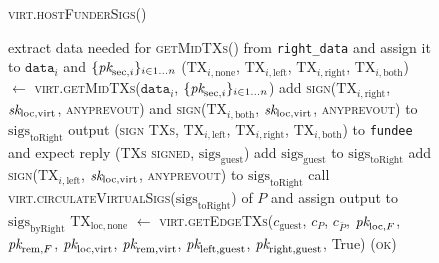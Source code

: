 \begin{figure}[H]
  \begin{processbox}{\textsc{virt.hostFunderSigs}()}
    \begin{algorithmic}[1]
        \State extract data needed for \textsc{getMidTXs}() from
        \texttt{right\_data} and assign it to $\texttt{data}_i$ and
        $\{\textit{pk}_{\mathrm{sec}, i}\}_{i \in 1 \dots n}$
        \State ($\mathrm{TX}_{i, \mathrm{none}}$, $\mathrm{TX}_{i,
        \mathrm{left}}$, $\mathrm{TX}_{i, \mathrm{right}}$, $\mathrm{TX}_{i,
        \mathrm{both}}$) $\gets$ \textsc{virt.getMidTXs}($\texttt{data}_i$,
        $\{\textit{pk}_{\mathrm{sec}, i}\}_{i \in 1 \dots n}$)
        \State add \textsc{sign}($\mathrm{TX}_{i, \mathrm{right}}$,
        $\textit{sk}_{\mathrm{loc}, \mathrm{virt}}$, \textsc{anyprevout}) and
        \textsc{sign}($\mathrm{TX}_{i, \mathrm{both}}$, $\textit{sk}_{\mathrm{loc},
        \mathrm{virt}}$, \textsc{anyprevout}) to
        $\mathrm{sigs}_{\mathrm{toRight}}$ 
        \State output (\textsc{sign TXs}, $\mathrm{TX}_{i, \mathrm{left}}$,
        $\mathrm{TX}_{i, \mathrm{right}}$, $\mathrm{TX}_{i, \mathrm{both}}$)
        to \texttt{fundee} and expect reply (\textsc{TXs signed},
        $\mathrm{sigs}_{\mathrm{guest}}$)
        \State add $\mathrm{sigs}_{\mathrm{guest}}$ to
        $\mathrm{sigs}_{\mathrm{toRight}}$
         
          \State add \textsc{sign}($\mathrm{TX}_{i, \mathrm{left}}$,
          $\textit{sk}_{\mathrm{loc}, \mathrm{virt}}$, \textsc{anyprevout}) to
          $\mathrm{sigs}_{\mathrm{toRight}}$
        \EndIf
      \EndFor
      \State call
      \textsc{virt.circulateVirtualSigs}($\mathrm{sigs}_{\mathrm{toRight}}$)
      of $P$ and assign output to $\mathrm{sigs}_{\mathrm{byRight}}$
      \State $\mathrm{TX}_{\mathrm{loc}, \mathrm{none}}$ $\gets$
      \textsc{virt.getEdgeTXs}($c_{\mathrm{guest}}$, $c_P$, $c_{\bar{P}}$,
      $\textit{pk}_{\mathrm{loc}, F}$, $\textit{pk}_{\mathrm{rem}, F}$, $\textit{pk}_{\mathrm{loc},
      \mathrm{virt}}$, $\textit{pk}_{\mathrm{rem}, \mathrm{virt}}$, $\textit{pk}_{\mathrm{left},
      \mathrm{guest}}$, $\textit{pk}_{\mathrm{right}, \mathrm{guest}}$, True)
      \State \Return (\textsc{ok})
    \end{algorithmic}
  \end{processbox}
  \caption{}
  \label{code:virtual-layer:funder-sigs}
\end{figure}


